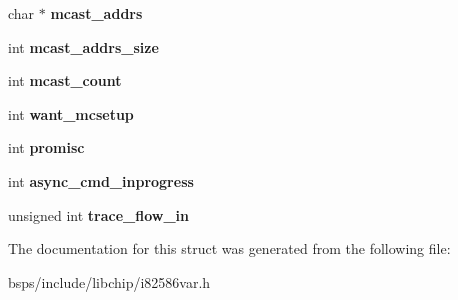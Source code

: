 \begin{DoxyCompactItemize}
char $\ast$ {\bfseries mcast\+\_\+addrs}
\item 
\mbox{\label{structie__softc_a7e0ca699f5075933f0410cfc5c2e8bbd}} 
int {\bfseries mcast\+\_\+addrs\+\_\+size}
\item 
\mbox{\label{structie__softc_afa8f8d9de72d52ecbf1683ab57f6569f}} 
int {\bfseries mcast\+\_\+count}
\item 
\mbox{\label{structie__softc_a52f09530dfa4fdda5d3b32925250da51}} 
int {\bfseries want\+\_\+mcsetup}
\item 
\mbox{\label{structie__softc_a8a50afc1d9c22e3333b56c58726c0b2f}} 
int {\bfseries promisc}
\item 
\mbox{\label{structie__softc_a0945c6adc80fe88f95ff1147a00257bd}} 
int {\bfseries async\+\_\+cmd\+\_\+inprogress}
\item 
\mbox{\label{structie__softc_a4c445c2712ae830e14df006c512bfcae}} 
unsigned int {\bfseries trace\+\_\+flow\+\_\+in}
\end{DoxyCompactItemize}


The documentation for this struct was generated from the following file\+:\begin{DoxyCompactItemize}
\item 
bsps/include/libchip/i82586var.\+h\end{DoxyCompactItemize}

